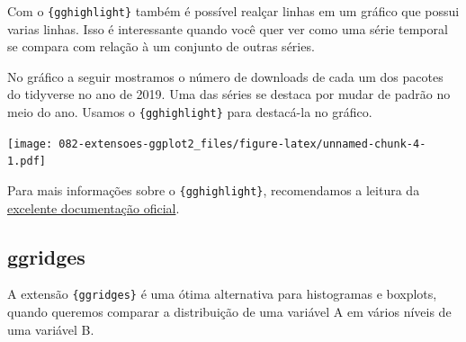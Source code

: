 \documentclass[
]{book}
\newenvironment{Shaded}{\begin{snugshade}}{\end{snugshade}}
\newcommand{\AttributeTok}[1]{\textcolor[rgb]{0.77,0.63,0.00}{#1}}
\newcommand{\DecValTok}[1]{\textcolor[rgb]{0.00,0.00,0.81}{#1}}
\newcommand{\FunctionTok}[1]{\textcolor[rgb]{0.00,0.00,0.00}{#1}}
\newcommand{\NormalTok}[1]{#1}
\newcommand{\OtherTok}[1]{\textcolor[rgb]{0.56,0.35,0.01}{#1}}
\newcommand{\SpecialCharTok}[1]{\textcolor[rgb]{0.00,0.00,0.00}{#1}}
\newcommand{\StringTok}[1]{\textcolor[rgb]{0.31,0.60,0.02}{#1}}
\begin{document}
Com o \texttt{\{gghighlight\}} também é possível realçar linhas em um gráfico que possui varias linhas. Isso é interessante quando você quer ver como uma série temporal se compara com relação à um conjunto de outras séries.

No gráfico a seguir mostramos o número de downloads de cada um dos pacotes do tidyverse no ano de 2019. Uma das séries se destaca por mudar de padrão no meio do ano. Usamos o \texttt{\{gghighlight\}} para destacá-la no gráfico.

\begin{Shaded}
\end{Shaded}

\texttt{[image: 082-extensoes-ggplot2\_files/figure-latex/unnamed-chunk-4-1.pdf]}

Para mais informações sobre o \texttt{\{gghighlight\}}, recomendamos a leitura da \href{https://yutannihilation.github.io/gghighlight/index.html}{excelente documentação oficial}.

\hypertarget{ggridges}{%
\subsection{ggridges}\label{ggridges}}

A extensão \texttt{\{ggridges\}} é uma ótima alternativa para histogramas e boxplots, quando queremos comparar a distribuição de uma variável A em vários níveis de uma variável B.
\end{document}

